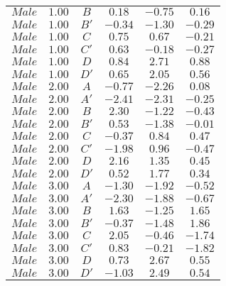 \begin{tabular}{cccccc}
$Male$ & $1.00$ & $B$ & $0.18$ & $-0.75$ & $0.16$\\
$Male$ & $1.00$ & $B'$ & $-0.34$ & $-1.30$ & $-0.29$\\
$Male$ & $1.00$ & $C$ & $0.75$ & $0.67$ & $-0.21$\\
$Male$ & $1.00$ & $C'$ & $0.63$ & $-0.18$ & $-0.27$\\
$Male$ & $1.00$ & $D$ & $0.84$ & $2.71$ & $0.88$\\
$Male$ & $1.00$ & $D'$ & $0.65$ & $2.05$ & $0.56$\\
$Male$ & $2.00$ & $A$ & $-0.77$ & $-2.26$ & $0.08$\\
$Male$ & $2.00$ & $A'$ & $-2.41$ & $-2.31$ & $-0.25$\\
$Male$ & $2.00$ & $B$ & $2.30$ & $-1.22$ & $-0.43$\\
$Male$ & $2.00$ & $B'$ & $0.53$ & $-1.38$ & $-0.01$\\
$Male$ & $2.00$ & $C$ & $-0.37$ & $0.84$ & $0.47$\\
$Male$ & $2.00$ & $C'$ & $-1.98$ & $0.96$ & $-0.47$\\
$Male$ & $2.00$ & $D$ & $2.16$ & $1.35$ & $0.45$\\
$Male$ & $2.00$ & $D'$ & $0.52$ & $1.77$ & $0.34$\\
$Male$ & $3.00$ & $A$ & $-1.30$ & $-1.92$ & $-0.52$\\
$Male$ & $3.00$ & $A'$ & $-2.30$ & $-1.88$ & $-0.67$\\
$Male$ & $3.00$ & $B$ & $1.63$ & $-1.25$ & $1.65$\\
$Male$ & $3.00$ & $B'$ & $-0.37$ & $-1.48$ & $1.86$\\
$Male$ & $3.00$ & $C$ & $2.05$ & $-0.46$ & $-1.74$\\
$Male$ & $3.00$ & $C'$ & $0.83$ & $-0.21$ & $-1.82$\\
$Male$ & $3.00$ & $D$ & $0.73$ & $2.67$ & $0.55$\\
$Male$ & $3.00$ & $D'$ & $-1.03$ & $2.49$ & $0.54$\\
\end{tabular}
